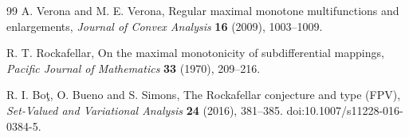 \begin{thebibliography}{99}
A. Verona and M. E. Verona,
Regular maximal monotone multifunctions and enlargements,
\emph{Journal of Convex Analysis} \textbf{16} (2009), 1003--1009.

R. T. Rockafellar,
On the maximal monotonicity of subdifferential mappings,
\emph{Pacific Journal of Mathematics} \textbf{33} (1970), 209--216.

R. I. Bo\c{t}, O. Bueno and S. Simons,
The Rockafellar conjecture and type (FPV),
\emph{Set-Valued and Variational Analysis} \textbf{24} (2016), 381--385.
doi:10.1007/s11228-016-0384-5.

\end{thebibliography}


